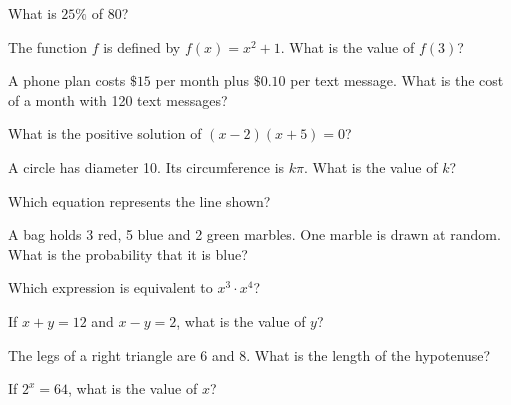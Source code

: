 \begin{exo}{}
What is $25\%$ of $80$?
\end{exo}
\begin{exo}{}
The function $f$ is defined by $f(x)=x^2+1$. What is the value of $f(3)$?
\end{exo}
\begin{exo}[Algebra]{}
A phone plan costs $\$15$ per month plus $\$0.10$ per text message. What is the cost of a month with 120 text messages?
\end{exo}
\begin{exo}{\sprtag}
What is the positive solution of $(x-2)(x+5)=0$?
\end{exo}
\begin{exo}{\sprtag}
A circle has diameter 10. Its circumference is $k\pi$. What is the value of $k$?
\end{exo}
\begin{exo}[Algebra]{}
Which equation represents the line shown?
\end{exo}
\begin{exo}{}
A bag holds 3 red, 5 blue and 2 green marbles. One marble is drawn at random. What is the probability that it is blue?
\end{exo}
\begin{exo}{}
Which expression is equivalent to $x^3\cdot x^4$?
\end{exo}
\begin{exo}[Algebra]{\sprtag}
If $x+y=12$ and $x-y=2$, what is the value of $y$?
\end{exo}
\begin{exo}{}
The legs of a right triangle are 6 and 8. What is the length of the hypotenuse?
\end{exo}
\begin{exo}{\sprtag}
If $2^x=64$, what is the value of $x$?
\end{exo}
